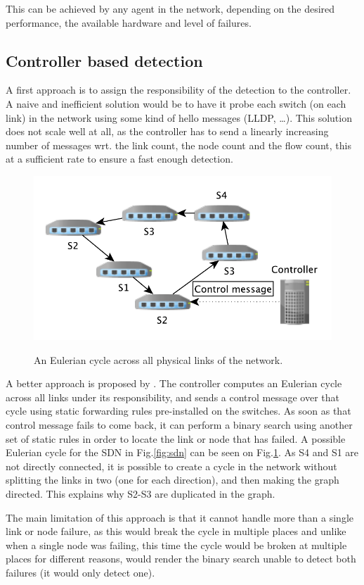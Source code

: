 \documentclass[]{IEEEtran}
\begin{document}
This can be achieved by any agent in the network, depending on the desired performance, the available hardware and level of failures.

\subsection{Controller based detection}
A first approach is to assign the responsibility of the detection to the controller. A naive and inefficient solution would be to have it probe each switch (on each link) in the network using some kind of hello messages (LLDP\cite{5409813}, \ldots). This solution does not scale well at all\cite{6364688}, as the controller has to send a linearly increasing number of messages wrt. the link count, the node count and the flow count, this at a sufficient rate to ensure a fast enough detection.

\begin{figure}
	\includegraphics[width=.5\textwidth]{images/euler.pdf}
	\label{fig:cycle}
	\caption{An Eulerian cycle across all physical links of the network.}
\end{figure}

A better approach is proposed by \cite{2013arXiv1308.4465K}. The controller computes an Eulerian cycle across all links under its responsibility, and sends a control message over that cycle using static forwarding rules pre-installed on the switches. As soon as that control message fails to come back, it can perform a binary search using another set of static rules in order to locate the link or node that has failed. A possible Eulerian cycle for the SDN in Fig.\ref{fig:sdn} can be seen on Fig.\ref{fig:cycle}. As S4 and S1 are not directly connected, it is possible to create a cycle in the network without splitting the links in two (one for each direction), and then making the graph directed. This explains why S2-S3 are duplicated in the graph.

The main limitation of this approach is that it cannot handle more than a single link or node failure, as this would break the cycle in multiple places and unlike when a single node was failing, this time the cycle would be broken at multiple places for different reasons, would render the binary search unable to detect both failures (it would only detect one).
\end{document}
